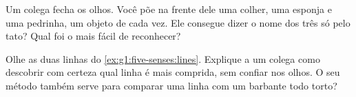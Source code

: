 \begin{exercise}[$\star$]\label{exo:g1:five-senses:8}
Um colega fecha os olhos. Você põe na frente dele uma colher, uma
esponja e uma pedrinha, um objeto de cada vez. Ele consegue dizer o
nome dos três só pelo tato? Qual foi o mais fácil de reconhecer?
\end{exercise}

\begin{exercise}[$\star\star$]\label{exo:g1:five-senses:9}
Olhe as duas linhas do \cref{ex:g1:five-senses:lines}. Explique a um
colega como descobrir com certeza qual linha é mais comprida, sem
confiar nos olhos. O seu método também serve para comparar uma linha
com um barbante todo torto?
\end{exercise}
